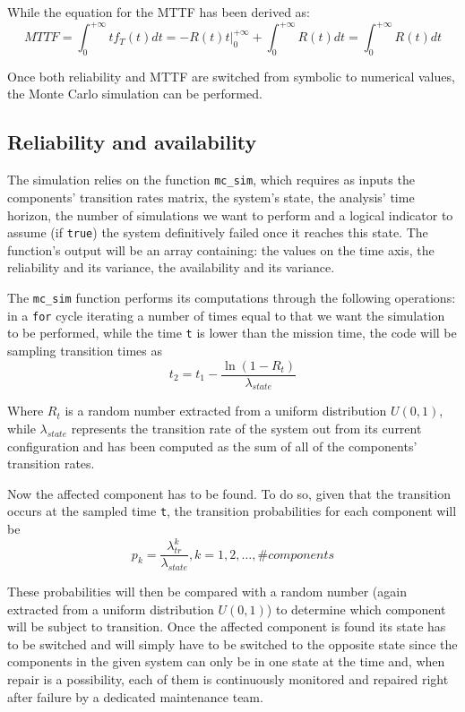\documentclass[a4paper,11pt]{article}
\begin{document}
While the equation for the MTTF has been derived as:
\begin{equation}
    MTTF = \int_{0}^{+\infty} t f_T(t) dt = -R(t)t \bigg\rvert_{0}^{+\infty} + \int_{0}^{+\infty} R(t) dt = \int_{0}^{+\infty} R(t)dt
\end{equation}

Once both reliability and MTTF are switched from symbolic to numerical values,
the Monte Carlo simulation can be performed.

\subsection{Reliability and availability}

The simulation relies on the function \texttt{mc\_sim}, which requires as inputs
the components' transition rates matrix, the system's state, the analysis' time
horizon, the number of simulations we want to perform and a logical indicator to
assume (if \texttt{true}) the system definitively failed once it reaches this
state. The function's output will be an array containing: the values on the time
axis, the reliability and its variance, the availability and its variance.

The \texttt{mc\_sim} function performs its computations through the following
operations: in a \texttt{for} cycle iterating a number of times equal to that we
want the simulation to be performed, while the time \texttt{t} is lower than the
mission time, the code will be sampling transition times as
\begin{equation}
    t_2 = t_1 - \frac{\ln(1-R_t)}{\lambda_{state}}
\end{equation}

Where $R_t$ is a random number extracted from a uniform distribution $U(0,1)$,
while $\lambda_{state}$ represents the transition rate of the system out from
its current configuration and has been computed as the sum of all of the
components' transition rates.

\hspace{2em}

Now the affected component has to be found. To do so, given that the transition
occurs at the sampled time \texttt{t}, the transition probabilities for each
component will be
\begin{equation}
    p_k = \frac{\lambda^k_{tr}}{\lambda_{state}}, k = 1, 2, \ldots, \#components
\end{equation}

These probabilities will then be compared with a random number (again extracted
from a uniform distribution $U(0,1)$) to determine which component will be
subject to transition. Once the affected component is found its state has to be
switched and will simply have to be switched to the opposite state since the
components in the given system can only be in one state at the time and, when
repair is a possibility, each of them is continuously monitored and repaired
right after failure by a dedicated maintenance team.
\end{document}
